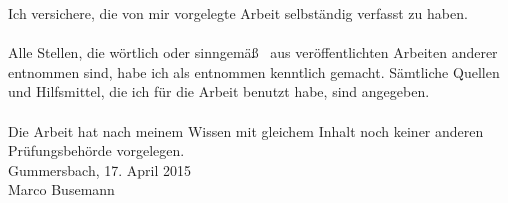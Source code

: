 
Ich versichere, die von mir vorgelegte Arbeit selbständig verfasst zu haben.\\ \\
Alle Stellen, die wörtlich oder sinngemäß \ aus veröffentlichten Arbeiten anderer entnommen sind, habe ich als entnommen kenntlich gemacht. Sämtliche Quellen und Hilfsmittel, die ich für die Arbeit benutzt habe, sind angegeben.\\ \\
Die Arbeit hat nach meinem Wissen mit gleichem Inhalt noch keiner anderen Prüfungsbehörde vorgelegen.
\vspace{1.5cm}
\\
Gummersbach, 17. April 2015
\vspace{2cm}
\\
Marco Busemann